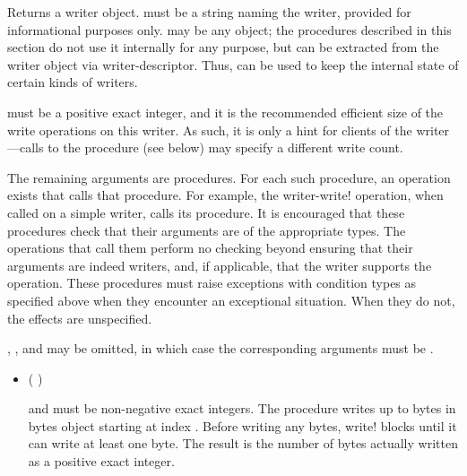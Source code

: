 \begin{entry}{%
}
   
Returns a writer object.  must be a string naming the writer,
provided for informational purposes only.  may be any
object; the procedures described in this section do not use it internally for any
purpose, but  can be extracted from the writer object via
{\cf writer-descriptor}. Thus,  can be used to keep the
internal state of certain kinds of writers.

 must be a positive exact integer, and it is the
recommended efficient size of the write operations on this writer. As
such, it is only a hint for clients of the writer---calls to the
 procedure (see below) may specify a different write
count.

The remaining arguments are procedures.  For each such procedure, an
operation exists that calls that procedure.  For example, the {\cf
  writer-write!} operation, when called on a simple writer, calls
its  procedure.
It is encouraged that these procedures check that their arguments are
of the appropriate types.  The operations that call them perform
no checking beyond ensuring that their  arguments are
indeed writers, and, if applicable, that the writer supports the operation.
These procedures must raise
exceptions with condition types as specified above when they encounter an
exceptional situation. When they do not, the effects are unspecified.

, , and  may be
omitted, in which case the corresponding arguments must be \schfalse.

\begin{itemize}
\item {\cf (   )}
   
   and  must be non-negative exact integers.
  The  procedure
  writes up to  bytes in bytes object 
  starting at index . Before writing any bytes, {\cf write!} blocks
  until it can write at least one byte. The result is the number of bytes
  actually written as a positive exact integer.
  

\end{itemize}
\end{entry}
